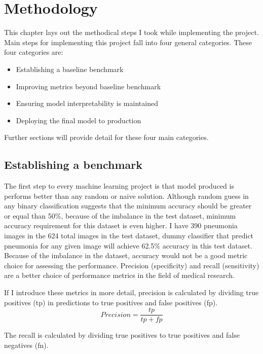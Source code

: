 \chapter{Methodology} \label{chap:methodology}
This chapter lays out the methodical steps I took while implementing the project.
Main steps for implementing this project fall into four general categories.
These four categories are:
\begin{itemize}
    \item Establishing a baseline benchmark
    \item Improving metrics beyond baseline benchmark
    \item Ensuring model interpretability is maintained
    \item Deploying the final model to production
\end{itemize}

Further sections will provide detail for these four main categories.

\section{Establishing a benchmark} \label{sec:estbench}
The first step to every machine learning project is that model produced is performs better than any random or naive solution.
Although random guess in any binary classification suggests that the minimum accuracy should be greater or equal than 50\%, because of the imbalance in the test dataset, minimum accuracy requirement for this dataset is even higher.
I have 390 pneumonia images in the 624 total images in the test dataset, dummy classifier that predict pneumonia for any given image will achieve 62.5\% accuracy in this test dataset.
Because of the imbalance in the dataset, accuracy would not be a good metric choice for assessing the performance.
Precision (specificity) and recall (sensitivity) are a better choice of performance metrics in the field of medical research.

If I introduce these metrics in more detail,
precision is calculated by dividing true positives (tp) in predictions to true positives and false positives (fp).
\begin{equation}
    Precision = \frac{tp}{tp + fp}
\end{equation}

The recall is calculated by dividing true positives to true positives and false negatives (fn).

